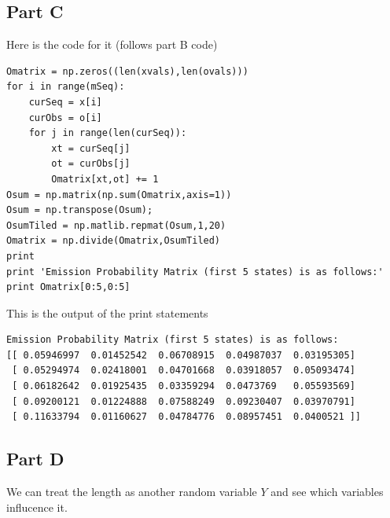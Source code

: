 \documentclass[twoside,11pt]{article}
\theoremstyle{definition}
\begin{document}
\subsection*{Part C}

Here is the code for it (follows part B code)

\begin{lstlisting}
Omatrix = np.zeros((len(xvals),len(ovals)))
for i in range(mSeq):
    curSeq = x[i]
    curObs = o[i]
    for j in range(len(curSeq)):
        xt = curSeq[j]
        ot = curObs[j]
        Omatrix[xt,ot] += 1
Osum = np.matrix(np.sum(Omatrix,axis=1))
Osum = np.transpose(Osum);
OsumTiled = np.matlib.repmat(Osum,1,20)
Omatrix = np.divide(Omatrix,OsumTiled)
print
print 'Emission Probability Matrix (first 5 states) is as follows:'
print Omatrix[0:5,0:5]
\end{lstlisting}

This is the output of the print statements
\begin{lstlisting}
Emission Probability Matrix (first 5 states) is as follows:
[[ 0.05946997  0.01452542  0.06708915  0.04987037  0.03195305]
 [ 0.05294974  0.02418001  0.04701668  0.03918057  0.05093474]
 [ 0.06182642  0.01925435  0.03359294  0.0473769   0.05593569]
 [ 0.09200121  0.01224888  0.07588249  0.09230407  0.03970791]
 [ 0.11633794  0.01160627  0.04784776  0.08957451  0.0400521 ]]
\end{lstlisting}

\subsection*{Part D}

We can treat the length as another random variable $Y$ and see which variables influcence it.
\end{document}
